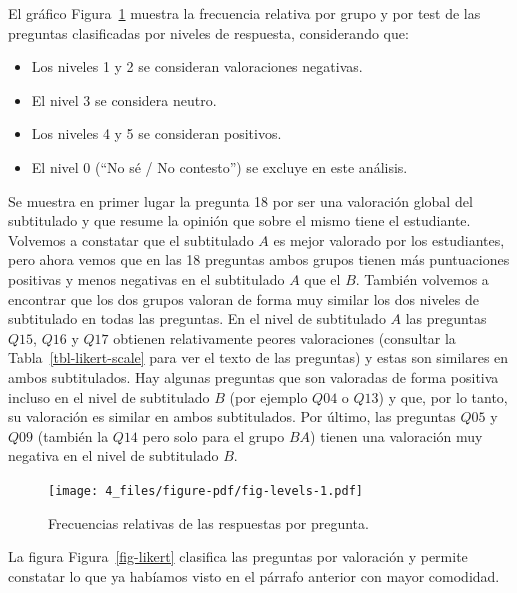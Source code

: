 \documentclass[
  12pt,
  a4paper,
  extrafontsizes,
  onecolumn,
  openright,
  table]{memoir}
\providecommand{\tightlist}{%
  \setlength{\itemsep}{0pt}\setlength{\parskip}{0pt}}\usepackage{longtable,booktabs,array}
\begin{document}
El gráfico Figura~\ref{fig-levels} muestra la frecuencia relativa por
grupo y por test de las preguntas clasificadas por niveles de respuesta,
considerando que:

\begin{itemize}
\tightlist
\item
  Los niveles 1 y 2 se consideran valoraciones negativas.
\item
  El nivel 3 se considera neutro.
\item
  Los niveles 4 y 5 se consideran positivos.
\item
  El nivel 0 (\enquote{No sé / No contesto}) se excluye en este
  análisis.
\end{itemize}

Se muestra en primer lugar la pregunta 18 por ser una valoración global
del subtitulado y que resume la opinión que sobre el mismo tiene el
estudiante. Volvemos a constatar que el subtitulado \(A\) es mejor
valorado por los estudiantes, pero ahora vemos que en las 18 preguntas
ambos grupos tienen más puntuaciones positivas y menos negativas en el
subtitulado \(A\) que el \(B\). También volvemos a encontrar que los dos
grupos valoran de forma muy similar los dos niveles de subtitulado en
todas las preguntas. En el nivel de subtitulado \(A\) las preguntas
\(Q15\), \(Q16\) y \(Q17\) obtienen relativamente peores valoraciones
(consultar la Tabla~\ref{tbl-likert-scale} para ver el texto de las
preguntas) y estas son similares en ambos subtitulados. Hay algunas
preguntas que son valoradas de forma positiva incluso en el nivel de
subtitulado \(B\) (por ejemplo \(Q04\) o \(Q13\)) y que, por lo tanto,
su valoración es similar en ambos subtitulados. Por último, las
preguntas \(Q05\) y \(Q09\) (también la \(Q14\) pero solo para el grupo
\(BA\)) tienen una valoración muy negativa en el nivel de subtitulado
\(B\).

\begin{figure}[h]

{\centering \texttt{[image: 4\_files/figure-pdf/fig-levels-1.pdf]}

}

\caption{\label{fig-levels}Frecuencias relativas de las respuestas por
pregunta.}

\end{figure}

La figura Figura~\ref{fig-likert} clasifica las preguntas por valoración
y permite constatar lo que ya habíamos visto en el párrafo anterior con
mayor comodidad.
\end{document}
